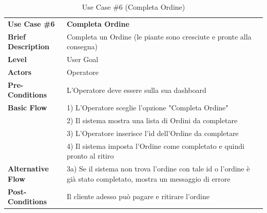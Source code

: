 \documentclass{article}
\begin{document}
\begin{table}[p]
    \begin{tabularx}{\textwidth}{ | l  X | }
        \rowcolor{lightgray!70}
        \hline
        \textbf{Use Case \#6} & \textbf{Completa Ordine} \\[0.5ex]
        \textbf{Brief Description} & Completa un Ordine (le piante sono cresciute e pronte alla consegna)\\
        \rowcolor{blue!10}
        \textbf{Level} & User Goal \\
        \textbf{Actors} & Operatore \\
        \rowcolor{blue!10}
        \textbf{Pre-Conditions} & L'Operatore deve essere sulla sua dashboard\\
        \textbf{Basic Flow} & 1) L'Operatore sceglie l'opzione "Completa Ordine"\\
        & 2) Il sistema mostra una lista di Ordini da completare\\
        & 3) L'Operatore inserisce l'id dell'Ordine da completare\\
        & 4) Il sistema imposta l'Ordine come completato e quindi pronto al ritiro\\
        \rowcolor{blue!10}
       \textbf{Alternative Flow} & 3a) Se il sistema non trova l'ordine con tale id o l'ordine è già stato completato, mostra un messaggio di errore\\
        \textbf{Post-Conditions} & Il cliente adesso può pagare e ritirare l'ordine\\
        \hline
    \end{tabularx}
    \caption{Use Case \#6 (Completa Ordine)}
\end{table}
\end{document}
